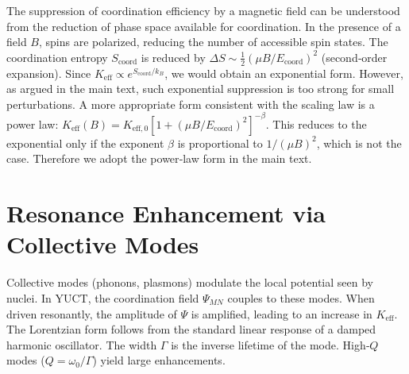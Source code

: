 \documentclass[12pt]{article}
\theoremstyle{remark}
\newcommand{\Keff}{K_{\mathrm{eff}}}
\newcommand{\Keffzero}{K_{\mathrm{eff},0}}
\begin{document}
	The suppression of coordination efficiency by a magnetic field can be understood from the reduction of phase space available for coordination. In the presence of a field \(B\), spins are polarized, reducing the number of accessible spin states. The coordination entropy \(S_{\text{coord}}\) is reduced by \(\Delta S \sim \frac{1}{2} (\mu B / E_{\mathrm{coord}})^2\) (second‑order expansion). Since \(\Keff \propto e^{S_{\text{coord}}/k_B}\), we would obtain an exponential form. However, as argued in the main text, such exponential suppression is too strong for small perturbations. A more appropriate form consistent with the scaling law is a power law: \(\Keff(B) = \Keffzero [1 + (\mu B/E_{\mathrm{coord}})^2]^{-\beta}\). This reduces to the exponential only if the exponent \(\beta\) is proportional to \(1/(\mu B)^2\), which is not the case. Therefore we adopt the power‑law form in the main text.
	
	\section{Resonance Enhancement via Collective Modes}
	\label{app:resonance}
	
	Collective modes (phonons, plasmons) modulate the local potential seen by nuclei. In YUCT, the coordination field \(\Psi_{MN}\) couples to these modes. When driven resonantly, the amplitude of \(\Psi\) is amplified, leading to an increase in \(\Keff\). The Lorentzian form follows from the standard linear response of a damped harmonic oscillator. The width \(\Gamma\) is the inverse lifetime of the mode. High‑\(Q\) modes (\(Q = \omega_0/\Gamma\)) yield large enhancements.
	
\end{document}

